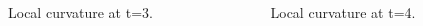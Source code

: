 \documentclass[12pt]{beamer}
\begin{document}
\begin{frame}
\begin{columns}
	\begin{column}{0.5\textwidth}
		\begin{figure}
			\caption{\small Local curvature at t=3.} 
		\end{figure}
	\end{column}
	\begin{column}{0.5\textwidth}
		\begin{figure}
			\caption{Local curvature at t=4.} 
		\end{figure}
	\end{column}
\end{columns}
\end{frame}
\end{document}
